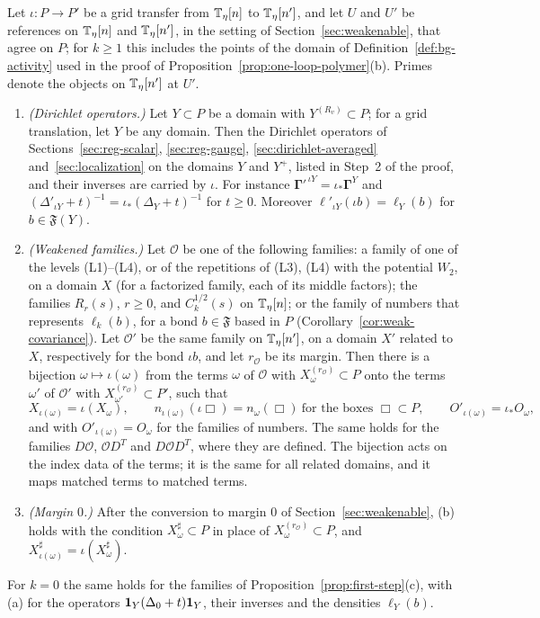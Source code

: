 \begin{lemma}\label{lem:torus-transfer}
Let $\iota:P\to P'$ be a grid transfer from $\mathbb T_\eta[n]$ to $\mathbb T_\eta[n']$, and let $U$ and $U'$ be references on $\mathbb T_\eta[n]$ and $\mathbb T_\eta[n']$, in the setting of Section~\ref{sec:weakenable}, that agree on $P$; for $k\ge1$ this includes the points of the domain of Definition~\ref{def:bg-activity} used in the proof of Proposition~\ref{prop:one-loop-polymer}(b). Primes denote the objects on $\mathbb T_\eta[n']$ at $U'$.
\begin{enumerate}[label=(\alph*)]
\item \emph{(Dirichlet operators.)} Let $Y\subset P$ be a domain with $Y^{(R_v)}\subset P$; for a grid translation, let $Y$ be any domain. Then the Dirichlet operators of Sections~\ref{sec:reg-scalar}, \ref{sec:reg-gauge}, \ref{sec:dirichlet-averaged} and~\ref{sec:localization} on the domains $Y$ and $Y^+$, listed in Step~2 of the proof, and their inverses are carried by $\iota$. For instance $\boldsymbol\Gamma'^{\,\iota Y}=\iota_*\boldsymbol\Gamma^Y$ and $(\Delta'_{\iota Y}+t)^{-1}=\iota_*(\Delta_Y+t)^{-1}$ for $t\ge0$. Moreover $\ell'_{\iota Y}(\iota b)=\ell_Y(b)$ for $b\in\mathfrak F(Y)$.
\item \emph{(Weakened families.)} Let $\mathcal O$ be one of the following families: a family of one of the levels (L1)--(L4), or of the repetitions of (L3), (L4) with the potential $W_2$, on a domain $X$ (for a factorized family, each of its middle factors); the families $R_r(s)$, $r\ge0$, and $C_k^{1/2}(s)$ on $\mathbb T_\eta[n]$; or the family of numbers that represents $\ell_k(b)$, for a bond $b\in\mathfrak F$ based in $P$ (Corollary~\ref{cor:weak-covariance}). Let $\mathcal O'$ be the same family on $\mathbb T_\eta[n']$, on a domain $X'$ related to $X$, respectively for the bond $\iota b$, and let $r_{\mathcal O}$ be its margin. Then there is a bijection $\omega\mapsto\iota(\omega)$ from the terms $\omega$ of $\mathcal O$ with $X_\omega^{(r_{\mathcal O})}\subset P$ onto the terms $\omega'$ of $\mathcal O'$ with $X_{\omega'}^{(r_{\mathcal O})}\subset P'$, such that
\[
X_{\iota(\omega)}=\iota(X_\omega),\qquad n_{\iota(\omega)}(\iota\Box)=n_\omega(\Box)\ \text{for the boxes }\Box\subset P,\qquad O'_{\iota(\omega)}=\iota_*O_\omega ,
\]
and with $O'_{\iota(\omega)}=O_\omega$ for the families of numbers. The same holds for the families $D\mathcal O$, $\mathcal OD^T$ and $D\mathcal OD^T$, where they are defined. The bijection acts on the index data of the terms; it is the same for all related domains, and it maps matched terms to matched terms.
\item \emph{(Margin $0$.)} After the conversion to margin $0$ of Section~\ref{sec:weakenable}, (b) holds with the condition $X^\sharp_\omega\subset P$ in place of $X^{(r_{\mathcal O})}_\omega\subset P$, and $X^\sharp_{\iota(\omega)}=\iota(X^\sharp_\omega)$.
\end{enumerate}
For $k=0$ the same holds for the families of Proposition~\ref{prop:first-step}(c), with (a) for the operators $\mathbf 1_Y(\Delta_0+t)\mathbf 1_Y$, their inverses and the densities $\ell_Y(b)$.
\end{lemma}

